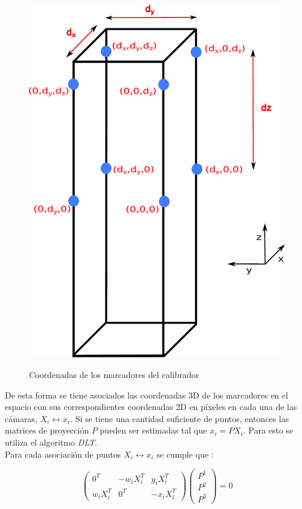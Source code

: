 \begin{figure}[ht!]
        \centering
     {\includegraphics[scale=0.38]{img/calibracion/medidas_calibrador.pdf}}    
     \caption{Coordenadas de los marcadores del calibrador}
      \label{fig: medidas_calibrador}     
\end{figure}

   De esta forma se tiene asociados las coordenadas 3D de los marcadores en el espacio con sus correspondientes coordenadas 2D en píxeles en cada una de las cámaras, $X_i \leftrightarrow x_i$. Si se tiene una cantidad suficiente de puntos, entonces las matrices de proyección $P$ pueden ser estimadas tal que $x_i=PX_i$. Para esto se utiliza el algoritmo \textit{DLT}.\\
   
   Para cada asociación de puntos $X_i \leftrightarrow x_i$ se cumple que \cite{hartley}:
   
   \[
   \begin{pmatrix}
   0^T & -w_iX_i^T & y_iX_i^T \\
   w_iX_i^T & 0^T & -x_iX_i^T
   \end{pmatrix}
   \begin{pmatrix}
    P^1 \\
    P^2 \\
    P^3
   \end{pmatrix}
   = 0
   \]
   
